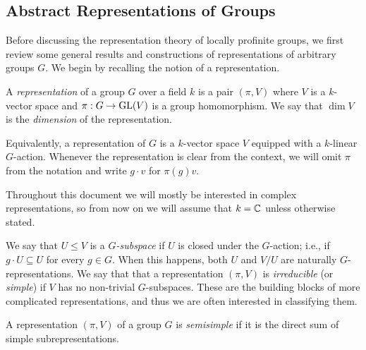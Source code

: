 \subsection{Abstract Representations of Groups} \label{Abstract_Reps}
Before discussing the representation theory of locally profinite groups, we first review some general results and constructions of representations of arbitrary groups $G$. We begin by recalling the notion of a representation.

\begin{defn}
    A \textit{representation} of a group $G$ over a field $k$ is a pair $(\pi,V)$ where $V$ is a $k$-vector space and $\pi:G\rightarrow\mathrm{GL}(V)$ is a group homomorphism. We say that $\dim V$ is the \textit{dimension} of the representation.
\end{defn}

Equivalently, a representation of $G$ is a $k$-vector space $V$ equipped with a $k$-linear $G$-action. Whenever the representation is clear from the context, we will omit $\pi$ from the notation and write $g\cdot v$ for $\pi(g)v$. 

Throughout this document we will mostly be interested in complex representations, so from now on we will assume that $k=\mathbb{C}$ unless otherwise stated.

We say that $U\leq V$ is a \textit{$G$-subspace} if $U$ is closed under the $G$-action; i.e., if $g\cdot U\subseteq U$ for every $g\in G$. When this happens, both $U$ and $V/U$ are naturally $G$-representations. We say that that a representation $(\pi,V)$ is \textit{irreducible} (or \textit{simple}) if $V$ has no non-trivial $G$-subspaces. These are the building blocks of more complicated representations, and thus we are often interested in classifying them.


\begin{defn}
    A representation $(\pi,V)$ of a group $G$ is \textit{semisimple} if it is the direct sum of simple subrepresentations. 
\end{defn}

